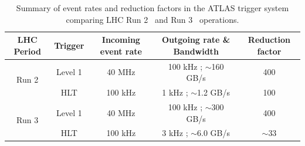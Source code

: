 \begin{table}[!htbp]
    \centering
    \begin{tabular}{c|c|c|c|c}
        \hline\hline
        \textbf{LHC Period} & \textbf{Trigger} & \textbf{Incoming event rate} & \textbf{Outgoing rate \& Bandwidth} & \textbf{Reduction factor} \\ 
        \hline
        \multirow{2}{*}{Run 2} & Level 1 & 40 MHz  & 100 kHz ; $\sim$160 GB/s & 400 \\
                               & HLT     & 100 kHz & 1 kHz ; $\sim$1.2 GB/s   & 100 \\
        \hline
        \multirow{2}{*}{Run 3} & Level 1 & 40 MHz  & 100 kHz ; $\sim$300 GB/s & 400 \\
                               & HLT     & 100 kHz & 3 kHz ; $\sim$6.0 GB/s   & $\sim$33 \\
        \hline\hline
    \end{tabular}
    \caption{Summary of event rates and reduction factors in the ATLAS trigger system comparing LHC Run 2~\cite{ATLAS-Run2-Trigger} and Run 3~\cite{ATLAS-Run3-Trigger} operations.}
    \label{tab:summary_trigger}
\end{table}